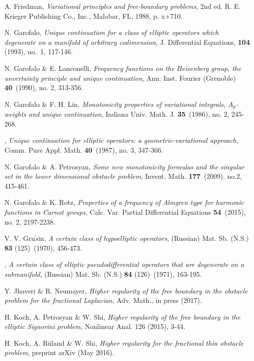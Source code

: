 \documentclass[11pt]{amsart}
\theoremstyle{plain}
\numberwithin{equation}{section}
\begin{document}
\begin{thebibliography}{99}
A. Friedman, \emph{Variational principles and free-boundary problems}, 2nd ed. R. E. Krieger Publishing Co., Inc., Malabar, FL, 1988, p. x+710.

N. Garofalo, \emph{Unique continuation for a class of elliptic operators which degenerate on a manifold of arbitrary codimension}, J. Differential Equations, \textbf{104} (1993), no.\ 1, 117-146.

N. Garofalo \& E. Lanconelli, \emph{Frequency functions on the Heisenberg group, the uncertainty principle and unique continuation}, Ann. Inst. Fourier (Grenoble) \textbf{40}~(1990), no. 2, 313-356.

N. Garofalo \& F. H. Lin, \emph{Monotonicity properties of variational integrals, $A_p$-weights and unique continuation}, Indiana Univ. Math. J. \textbf{35}~(1986), no. 2, 245-268.

\bysame, \emph{Unique continuation for elliptic operators: a geometric-variational approach}, Comm. Pure Appl. Math. \textbf{40}~(1987), no. 3, 347-366.

N. Garofalo \& A. Petrosyan, \emph{Some new monotonicity formulas and the singular set in the lower dimensional obstacle problem}, Invent. Math. \textbf{177}~(2009). no.2, 415-461.

N. Garofalo \& K. Rotz, \emph{Properties of a frequency of Almgren type for harmonic functions in Carnot groups}, Calc. Var. Partial Differential Equations \textbf{54}~(2015), no. 2, 2197-2238.

V. V. Gru$\check{s}$in, \emph{A certain class of hypoelliptic operators}, (Russian) Mat. Sb. (N.S.) \textbf{83} (125)~(1970), 456-473.

\bysame, \emph{A certain class of elliptic pseudodifferential operators that are degenerate on a submanifold}, (Russian) Mat. Sb. (N.S.) \textbf{84} (126)~(1971), 163-195.

Y. Jhaveri \& R. Neumayer, \emph{Higher regularity of the free boundary in the obstacle problem for the fractional Laplacian}, Adv. Math., in press (2017).

H. Koch, A. Petrosyan \& W. Shi, \emph{Higher regularity of the free boundary in the elliptic Signorini problem},
Nonlinear Anal. 126 (2015), 3-44.

H. Koch, A. R\"uland \& W. Shi, \emph{Higher regularity for the fractional thin obstacle problem},
preprint arXiv (May 2016).


\end{thebibliography}
\end{document}

